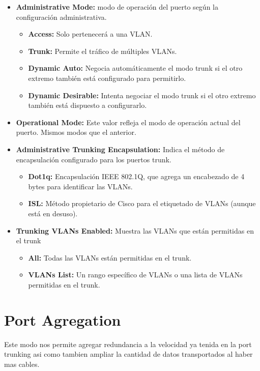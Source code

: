 \documentclass{article}
\begin{document}
\begin{itemize}
    \item \textbf{Administrative Mode:} modo de operación del puerto según la configuración administrativa.
        \begin{itemize}
                \item \textbf{Access:} Solo pertenecerá a una VLAN.
                \item \textbf{Trunk:} Permite el tráfico de múltiples VLANs.
                \item \textbf{Dynamic Auto:} Negocia automáticamente el modo trunk si el otro extremo también está configurado para permitirlo.
                \item \textbf{Dynamic Desirable:} Intenta negociar el modo trunk si el otro extremo también está dispuesto a configurarlo.
        \end{itemize}
    \item  \textbf{Operational Mode:} Este valor refleja el modo de operación actual del puerto. Mismos modos que el anterior.
    \item  \textbf{Administrative Trunking Encapsulation:} Indica el método de encapsulación configurado para los puertos trunk.
        \begin{itemize}
                \item \textbf{Dot1q:} Encapsulación IEEE 802.1Q, que agrega un encabezado de 4 bytes para identificar las VLANs.
                \item \textbf{ISL:} Método propietario de Cisco para el etiquetado de VLANs (aunque está en desuso).
        \end{itemize}
    \item  \textbf{Trunking VLANs Enabled:} Muestra las VLANs que están permitidas en el trunk
        \begin{itemize}
                    \item \textbf{All:} Todas las VLANs están permitidas en el trunk.
                    \item \textbf{VLANs List:} Un rango específico de VLANs o una lista de VLANs permitidas en el trunk.
        \end{itemize}
\end{itemize}

\section{Port Agregation}

Este modo nos permite agregar redundancia a la velocidad ya tenida en la port trunking asi como tambien ampliar la cantidad de datos transportados al haber mas cables. 
\end{document}
